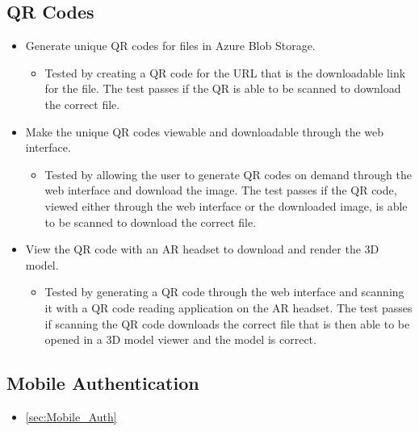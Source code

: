 \subsection{QR Codes}
\begin{itemize}
    \item Generate unique QR codes for files in Azure Blob Storage.
    \begin{itemize}
        \item Tested by creating a QR code for the URL that is the downloadable link for the file. The test passes if the QR is able to be scanned to download the correct file.
    \end{itemize}    

    \item Make the unique QR codes viewable and downloadable through the web interface.
    \begin{itemize}
        \item Tested by allowing the user to generate QR codes on demand through the web interface and download the image. The test passes if the QR code, viewed either through the web interface or the downloaded image, is able to be scanned to download the correct file.
    \end{itemize}    

    \item View the QR code with an AR headset to download and render the 3D model.
    \begin{itemize}
        \item Tested by generating a QR code through the web interface and scanning it with a QR code reading application on the AR headset. The test passes if scanning the QR code downloads the correct file that is then able to be opened in a 3D model viewer and the model is correct.
    \end{itemize} 
\end{itemize}


\subsection{Mobile Authentication}
\begin{itemize}
    \item \ref{sec:Mobile_Auth}
\end{itemize}

